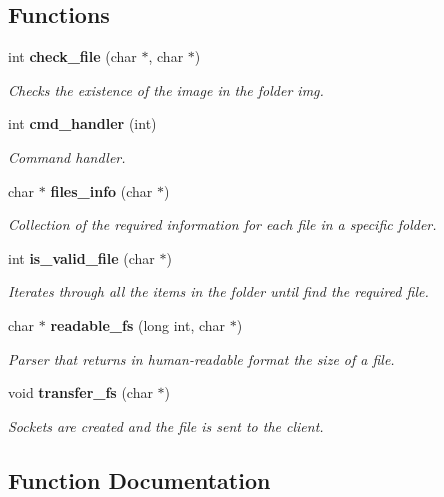 \subsection*{Functions}
\begin{DoxyCompactItemize}
\item 
int \textbf{ check\+\_\+file} (char $\ast$, char $\ast$)
\begin{DoxyCompactList}\small\item\em Checks the existence of the image in the folder img. \end{DoxyCompactList}\item 
int \textbf{ cmd\+\_\+handler} (int)
\begin{DoxyCompactList}\small\item\em Command handler. \end{DoxyCompactList}\item 
char $\ast$ \textbf{ files\+\_\+info} (char $\ast$)
\begin{DoxyCompactList}\small\item\em Collection of the required information for each file in a specific folder. \end{DoxyCompactList}\item 
int \textbf{ is\+\_\+valid\+\_\+file} (char $\ast$)
\begin{DoxyCompactList}\small\item\em Iterates through all the items in the folder until find the required file. \end{DoxyCompactList}\item 
char $\ast$ \textbf{ readable\+\_\+fs} (long int, char $\ast$)
\begin{DoxyCompactList}\small\item\em Parser that returns in human-\/readable format the size of a file. \end{DoxyCompactList}\item 
void \textbf{ transfer\+\_\+fs} (char $\ast$)
\begin{DoxyCompactList}\small\item\em Sockets are created and the file is sent to the client. \end{DoxyCompactList}\end{DoxyCompactItemize}


\subsection{Function Documentation}
\mbox{\label{fileserv_8h_aa1925fbc16c1c8da726b22fdc83576e6}} 
